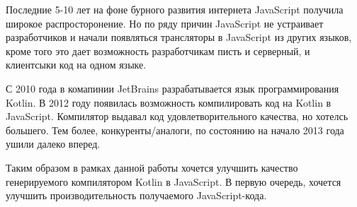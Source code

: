 \startprefacepage








Последние 5-10 лет на фоне бурного развития интернета JavaScript получила широкое распросторонение. Но по ряду причин JavaScript не устраивает разработчиков и начали появляться трансляторы в JavaScript из других языков, кроме того это дает возможность разработчикам писть и серверный, и клиентсыки код на одном языке.

С 2010 года в комапинии JetBrains разрабатывается язык программирования Kotlin. В 2012 году появилась возможность компилировать код на Kotlin в JavaScript. Компилятор выдавал код удовлетворительного качества, но хотелсь большего. Тем более, конкуренты/аналоги, по состоянию на начало 2013 года ушили далеко вперед.

Таким образом в рамках данной работы хочется улучшить качество генерируемого компилятором Kotlin в JavaScript. В первую очередь, хочется улучшить производительность получаемого JavaScript-кода.

